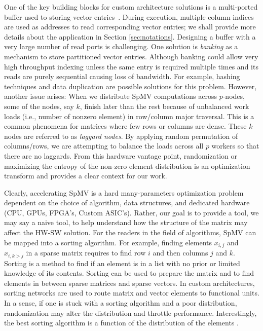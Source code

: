 \documentclass[acmsmall]{acmart}
\begin{document}
One of the key building blocks for custom architecture solutions is a
multi-ported buffer used to storing vector
entries~\cite{fowers2014high}.  During execution, multiple column
indices are used as addresses to read corresponding vector entries; we
shall provide more details about the application in Section
\ref{sec:notations}.  Designing a buffer with a very large number of
read ports is challenging.  One solution is {\em banking} as a
mechanism to store partitioned vector entries.  Although banking could
allow very high throughput indexing unless the same entry is required
multiple times and its reads are purely sequential causing loss of
bandwidth.  For example, hashing techniques and data duplication are
possible solutions for this problem. However, another issue arises:
When we distribute SpMV computations across $p$-nodes, some of the
nodes, say $k$, finish later than the rest because of unbalanced work
loads (i.e., number of nonzero element) in row/column major
traversal. This is a common phenomena for matrices where few rows or
columns are dense. These $k$ nodes are referred to as {\em laggard
  nodes}.  By applying random permutation of columns/rows, we are
attempting to balance the loads across all $p$ workers so that there
are no laggards. From this hardware vantage point, randomization or
maximizing the entropy of the non-zero element distribution is an
optimization transform and provides a clear context for our work.

Clearly, accelerating SpMV is a hard many-parameters optimization
problem dependent on the choice of algorithm, data structures, and
dedicated hardware (CPU, GPUs, FPGA's, Custom ASIC's).  Rather, our
goal is to provide a tool, we may say a naive tool, to help understand
how the structure of the matrix may affect the HW-SW solution.  For
the readers in the field of algorithms, SpMV can be mapped into a
sorting algorithm. For example, finding elements $x_{i,j}$ and
$x_{i,k>j}$ in a sparse matrix requires to find row $i$ and then
columns $j$ and $k$.  Sorting is a method to find if an element is in
a list with no prior or limited knowledge of its contents.  Sorting
can be used to prepare the matrix and to find elements in between
sparse matrices and sparse vectors. In custom architectures, sorting
networks are used to route matrix and vector elements to functional
units. In a sense, if one is stuck with a sorting algorithm and a poor
distribution, randomization may alter the distribution and throttle
performance. Interestingly, the best sorting algorithm is a function
of the distribution of the elements \cite{LiGP2004,HuangGl2009}.
\end{document}
